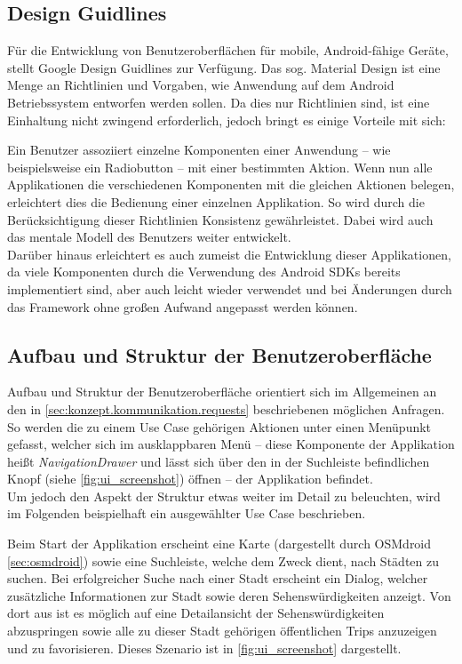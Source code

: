 		\subsection{Design Guidlines} %
		
			Für die Entwicklung von Benutzeroberflächen für mobile, Android-fähige Geräte, stellt Google Design Guidlines zur Verfügung. Das sog. Material Design \cite{Google.3182020} ist eine Menge an Richtlinien und Vorgaben, wie Anwendung auf dem Android Betriebssystem entworfen werden sollen. Da dies nur Richtlinien sind, ist eine Einhaltung nicht zwingend erforderlich, jedoch bringt es einige Vorteile mit sich:
			
			Ein Benutzer assoziiert einzelne Komponenten einer Anwendung -- wie beispielsweise ein Radiobutton -- mit einer bestimmten Aktion. Wenn nun alle Applikationen die verschiedenen Komponenten mit die gleichen Aktionen belegen, erleichtert dies die Bedienung einer einzelnen Applikation. So wird durch die Berücksichtigung dieser Richtlinien Konsistenz gewährleistet. Dabei wird auch das mentale Modell des Benutzers weiter entwickelt. \\
			Darüber hinaus erleichtert es auch zumeist die Entwicklung dieser Applikationen, da viele Komponenten durch die Verwendung des Android \acs{SDK}s bereits implementiert sind, aber auch leicht wieder verwendet und bei Änderungen durch das Framework ohne großen Aufwand angepasst werden können. \cite{SaadiaMinhas.3232020}
		
		\subsection{Aufbau und Struktur der Benutzeroberfläche} %
		
			Aufbau und Struktur der Benutzeroberfläche orientiert sich im Allgemeinen an den in \autoref{sec:konzept.kommunikation.requests} beschriebenen möglichen Anfragen. So werden die zu einem Use Case gehörigen Aktionen unter einen Menüpunkt gefasst, welcher sich im ausklappbaren Menü -- diese Komponente der Applikation heißt \textit{NavigationDrawer} und lässt sich über den in der Suchleiste befindlichen Knopf (siehe \autoref{fig:ui_screenshot}) öffnen -- der Applikation befindet. \\
			Um jedoch den Aspekt der Struktur etwas weiter im Detail zu beleuchten, wird im Folgenden beispielhaft ein ausgewählter Use Case beschrieben. 
		
			Beim Start der Applikation erscheint eine Karte (dargestellt durch OSMdroid \autoref{sec:osmdroid}) sowie eine Suchleiste, welche dem Zweck dient, nach Städten zu suchen. Bei erfolgreicher Suche nach einer Stadt erscheint ein Dialog, welcher zusätzliche Informationen zur Stadt sowie deren Sehenswürdigkeiten anzeigt. Von dort aus ist es möglich auf eine Detailansicht der Sehenswürdigkeiten abzuspringen sowie alle zu dieser Stadt gehörigen öffentlichen Trips anzuzeigen und zu favorisieren. Dieses Szenario ist in \autoref{fig:ui_screenshot} dargestellt.  
			
